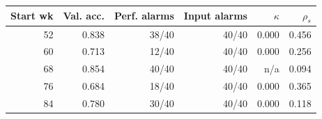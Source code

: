 \begin{tabular}{rrrrrr}
\toprule
Start wk & Val. acc. & Perf. alarms & Input alarms & $\kappa$ & $\rho_s$ \\
\midrule
52 & 0.838 & 38/40 & 40/40 & 0.000 & 0.456 \\
60 & 0.713 & 12/40 & 40/40 & 0.000 & 0.256 \\
68 & 0.854 & 40/40 & 40/40 & n/a & 0.094 \\
76 & 0.684 & 18/40 & 40/40 & 0.000 & 0.365 \\
84 & 0.780 & 30/40 & 40/40 & 0.000 & 0.118 \\
\bottomrule
\end{tabular}